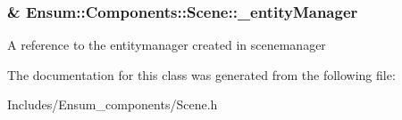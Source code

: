 \subsubsection[{\texorpdfstring{\+\_\+entity\+Manager}{_entityManager}}]{\& Ensum\+::\+Components\+::\+Scene\+::\+\_\+entity\+Manager\hspace{0.3cm}{\ttfamily [protected]}}\hypertarget{class_ensum_1_1_components_1_1_scene_af7eb8e3279c5b6768f442ae05b44e75f}{}\label{class_ensum_1_1_components_1_1_scene_af7eb8e3279c5b6768f442ae05b44e75f}
A reference to the entitymanager created in scenemanager 

The documentation for this class was generated from the following file\+:\begin{DoxyCompactItemize}
\item 
Includes/\+Ensum\+\_\+components/Scene.\+h\end{DoxyCompactItemize}
